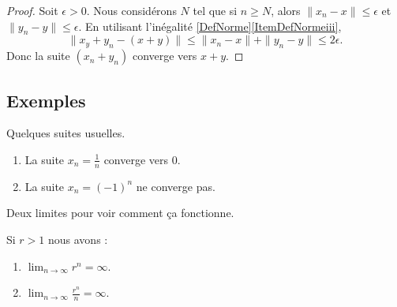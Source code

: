 \begin{proof}
    Soit \( \epsilon>0\). Nous considérons \( N\) tel que si \( n\geq N\), alors \( \| x_n-x \|\leq \epsilon\) et \( \| y_n-y \|\leq \epsilon\). En utilisant l'inégalité \ref{DefNorme}\ref{ItemDefNormeiii},
    \begin{equation}
        \| x_y+y_n-(x+y) \|\leq \| x_n-x \|+\| y_n-y \|\leq 2\epsilon.
    \end{equation}
    Donc la suite \( (x_n+y_n)\) converge vers \( x+y\).
\end{proof}

 
\subsection{Exemples}

\begin{example}
	Quelques suites usuelles.
	\begin{enumerate}
		\item
			La suite $x_n=\frac{1}{ n }$ converge vers $0$.
		\item
			La suite $x_n=(-1)^n$ ne converge pas.
	\end{enumerate}
\end{example}

Deux limites pour voir comment ça fonctionne.
\begin{lemma}
    Si \( r>1\) nous avons :
    \begin{enumerate}
        \item
            \( \lim_{n\to \infty} r^n=\infty\).
        \item
            \( \lim_{n\to \infty} \frac{ r^n }{ n }=\infty\).
    \end{enumerate}
\end{lemma}

